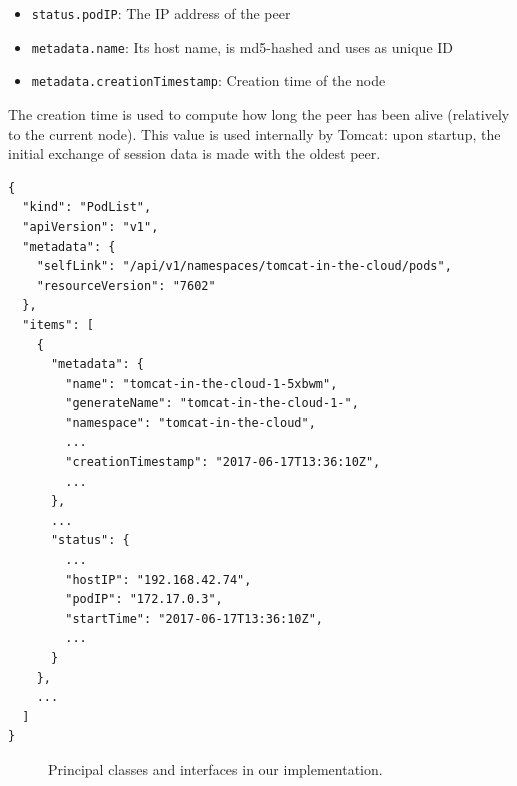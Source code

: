 \documentclass[11pt,a4paper]{article}
\begin{document}
\begin{itemize}
  \item \texttt{status.podIP}: The IP address of the peer
  \item \texttt{metadata.name}: Its host name, is md5-hashed and uses as unique ID
  \item \texttt{metadata.creationTimestamp}: Creation time of the node
\end{itemize}

The creation time is used to compute how long the peer has been alive (relatively to the current node). This value is used internally by Tomcat: upon startup, the initial exchange of session data is made with the oldest peer.

\begin{lstlisting}[caption=Pod list returned by the API (excerpt),label=lst:api]
{
  "kind": "PodList",
  "apiVersion": "v1",
  "metadata": {
    "selfLink": "/api/v1/namespaces/tomcat-in-the-cloud/pods",
    "resourceVersion": "7602"
  },
  "items": [
    {
      "metadata": {
        "name": "tomcat-in-the-cloud-1-5xbwm",
        "generateName": "tomcat-in-the-cloud-1-",
        "namespace": "tomcat-in-the-cloud",
        ...
        "creationTimestamp": "2017-06-17T13:36:10Z",
        ...
      },
      ...
      "status": {
        ...
        "hostIP": "192.168.42.74",
        "podIP": "172.17.0.3",
        "startTime": "2017-06-17T13:36:10Z",
        ...
      }
    },
    ...
  ]
}
\end{lstlisting}

\begin{figure}
  \centering

  \caption{Principal classes and interfaces in our implementation.}\label{fig:classes}
\end{figure}
\end{document}
